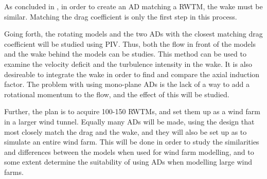 As concluded in \cite{Theunissen2014}, in order to create an \gls{AD} matching a \gls{RWTM}, the wake must be similar. Matching the drag coefficient is only the first step in this process. 

Going forth, the rotating models and the two \gls{AD}s with the closest matching drag coefficient will be studied using \gls{PIV}. Thus, both the flow in front of the models and the wake behind the models can be studies. This method can be used to examine the velocity deficit and the turbulence intensity in the wake. It is also desireable to integrate the wake in order to find and compare the axial induction factor. The problem with using mono-plane \gls{AD}s is the lack of a way to add a rotational momentum to the flow, and the effect of this will be studied. 

Further, the plan is to acquire 100-150 \gls{RWTM}s, and set them up as a wind farm in a larger wind tunnel. Equally many \gls{AD}s will be made, using the design that most closely match the drag and the wake, and they will also be set up as to simulate an entire wind farm. This will be done in order to study the similarities and differences between the models when used for wind farm modelling, and to some extent determine the suitability of using \gls{AD}s when modelling large wind farms. 




